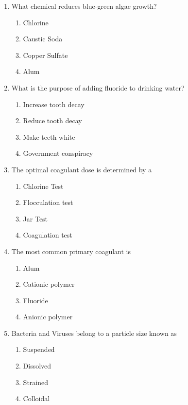 \begin{enumerate}
\item  What chemical reduces blue-green algae growth?\\
\begin{enumerate}
\item Chlorine\\
\item Caustic Soda\\
\item Copper Sulfate\\
\item Alum
\end{enumerate}


\item What is the purpose of adding fluoride to drinking water?
\begin{enumerate}
\item Increase tooth decay
\item Reduce tooth decay
\item Make teeth white
\item Government conspiracy
\end{enumerate}

\item The optimal coagulant dose is determined by a\\
\begin{enumerate}
\item Chlorine Test\\
\item Flocculation test\\
\item Jar Test\\
\item Coagulation test
\end{enumerate}

\item  The most common primary coagulant is\\
\begin{enumerate}
\item Alum\\
\item Cationic polymer\\
\item Fluoride\\
\item Anionic polymer
\end{enumerate}

\item  Bacteria and Viruses belong to a particle size known as\\
\begin{enumerate}
\item Suspended\\
\item Dissolved\\
\item Strained\\
\item Colloidal
\end{enumerate}


\end{enumerate}
